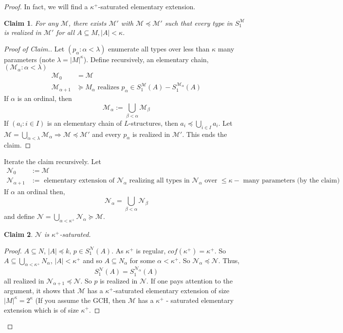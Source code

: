 \documentclass[letterpaper, 12pt]{article}
\newcommand{\cM}{\mathcal{M}}
\newcommand{\cN}{\mathcal{N}}
\theoremstyle{stdthm}
\theoremstyle{stddef}
\theoremstyle{stdnonum}
\newtheorem{claim}{Claim}
\theoremstyle{stdqands}
\theoremstyle{stdbold}
\begin{document}
\begin{proof}
In fact, we will find a $\kappa^+$-saturated elementary extension. 

\begin{claim}
For any $\cM$, there exists $\cM'$ with $\cM \preceq \cM'$ such that every type in $S_1^{\cM}$ is realized in $\cM'$ for all $A \subseteq M, |A| < \kappa$. 
\end{claim}

\begin{proof}[Proof of Claim.]
Let $(p_\alpha : \alpha < \lambda)$ enumerate all types over less than $\kappa$ many parameters (note $\lambda = |M|^\kappa$). Define recursively, an elementary chain, $(\cM_\alpha: \alpha < \lambda)$ 
\begin{align*}
\cM_0 &= \cM\\
\cM_{\alpha + 1} & \succeq M_\alpha \mbox{ realizes } p_\alpha \in S_1^\cM(A) - S_1^{\cM_\alpha}(A)
\end{align*}
If $\alpha$ is an ordinal, then 
\[ \cM_\alpha := \bigcup_{\beta < \alpha} \cM_\beta \]
If $(a_i: i \in I)$ is an elementary chain of $L$-structures, then $a_i \preceq \bigcup_{i \in I} a_i$. Let $\cM
 = \bigcup_{\alpha < \lambda} \cM_{\alpha} \Rightarrow \cM \preceq \cM'$ and every $p_\alpha$ is realized in $\cM'$. This ends the claim. 
\end{proof}
Iterate the claim recursively. Let 
\begin{align*}
\cN_0 &:= \cM \\
\cN_{\alpha + 1} &:= \mbox{ elementary extension of } \cN_\alpha \mbox{ realizing all types in } \cN_\alpha \mbox{ over  } \leq \kappa - \mbox{ many parameters (by the claim)}
\end{align*}
If $\alpha$ an ordinal then, 
\[ \cN_\alpha = \bigcup_{\beta < \alpha} \cN_\beta \]
and define $\cN = \bigcup_{\alpha < \kappa^+} \cN_\alpha \succeq \cM$. 

\begin{claim}
$\cN$ is $\kappa^+$-saturated. 
\end{claim}

\begin{proof}
$A \subseteq N$, $|A| \preceq k$, $p \in S_1^{\cN}(A)$. As $\kappa^+$ is regular, $cof(\kappa^+) = \kappa^+$. So $A \subseteq \bigcup_{\alpha < \kappa^+} N_\alpha$, $|A| < \kappa^+$ and so $A \subseteq N_\alpha$ for some $\alpha < \kappa^+$. So $\cN_\alpha \preceq \cN$. Thus, 
\[ S_1^\cN(A) = S_1^{\cN_\alpha}(A) \]
all realized in $\cN_{\alpha+1} \preceq \cN$. So $p$ is realized in $\cN$. If one pays attention to the argument, it shows that $\cM$ has a $\kappa^+$-saturated elementary extension of size $|M|^\kappa = 2^\kappa$ (If you assume the GCH, then $\cM$ has a $\kappa^+$ - saturated elementary extension which is of size $\kappa^+$. 
\end{proof}

\end{proof}
\end{document}
